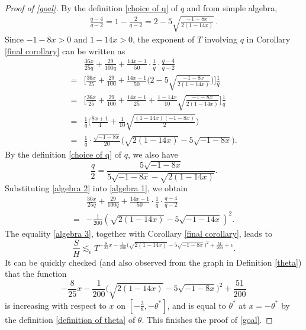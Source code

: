 \documentclass[11pt]{amsart}
\numberwithin{equation}{section}
\theoremstyle{definition}
\theoremstyle{proposition}
\begin{document}
\begin{proof}  [Proof of \eqref{goal}]
By the definition \eqref{choice of q} of $q$ and from simple algebra,  
\[
\begin{split}
\frac{q-4}{q-2}=1-\frac{2}{q-2}=2-5\sqrt{\frac{-1-8x}{2(1-14x)}}\,.  
\end{split}
\]
Since $-1-8x>0$ and $1-14x>0$, the exponent of $T$ involving $q$ in Corollary \ref{final corollary} can be written as 
\begin{equation}  \label{algebra 1}
\begin{split}
&\frac{36x}{25q}+\frac{29}{100q}+\frac{14x-1}{50}\cdot\frac{1}{q}\cdot \frac{q-4}{q-2} 
\\ =& \Big[\frac{36x}{25}+\frac{29}{100}+\frac{14x-1}{50}\Big(2-5\sqrt{\frac{-1-8x}{2(1-14x)}}\Big)\Big]\frac{1}{q}
\\ =& \Big[ \frac{36x}{25}+\frac{29}{100}+\frac{14x-1}{25} +\frac{1-14x}{10}\sqrt{\frac{-1-8x}{2(1-14x)}}\Big]\frac{1}{q}
\\ =& \frac{1}{q}\Big(\frac{8x+1}{4}+\frac{1}{10}\sqrt{\frac{(1-14x)(-1-8x)}{2}}\Big)
\\ =& \frac{1}{q} \cdot \frac{\sqrt{-1-8x}}{20} \Big( \sqrt{2(1-14x)} -5\sqrt{-1-8x}\Big). 
\end{split}    
\end{equation}
By the definition \eqref{choice of q} of $q$, we also have
\begin{equation}  \label{algebra 2}
\frac{q}{2}= \frac{5\sqrt{-1-8x}}{5\sqrt{-1-8x}-\sqrt{2(1-14x)}}.    
\end{equation}
Substituting \eqref{algebra 2} into \eqref{algebra 1}, we obtain
\begin{equation}  \label{algebra 3}
\begin{split}
&\frac{36x}{25q}+\frac{29}{100q}+\frac{14x-1}{50}\cdot\frac{1}{q}\cdot \frac{q-4}{q-2}
\\ =& -\frac{1}{200} (\sqrt{2(1-14x)}-5\sqrt{-1-14x})^2.
\end{split}   
\end{equation}
The equality \eqref{algebra 3}, together with Corollary \ref{final corollary}, leads to 
\begin{equation}  \label{upper bound useful 3}
\frac{S}{H}\lesssim_\epsilon T^{-\frac{8}{25}x-\frac{1}{200}\Big(\sqrt{2(1-14x)}-5\sqrt{-1-8x}\Big)^2+\frac{51}{200}+\epsilon}.
\end{equation}
It can be quickly checked (and also observed from the graph in Definition \ref{theta}) that the function
\[
-\frac{8}{25}x-\frac{1}{200}\Big(\sqrt{2(1-14x)}-5\sqrt{-1-8x}\Big)^2+\frac{51}{200}
\]
is increasing with respect to $x$ on $[-\frac{3}{8},-\theta^*]$, and is equal to $\theta^*$ at $x=-\theta^*$ by the definition \eqref{definition of theta} of $\theta$. This finishes the proof of \eqref{goal}. 

\end{proof}
\end{document}
